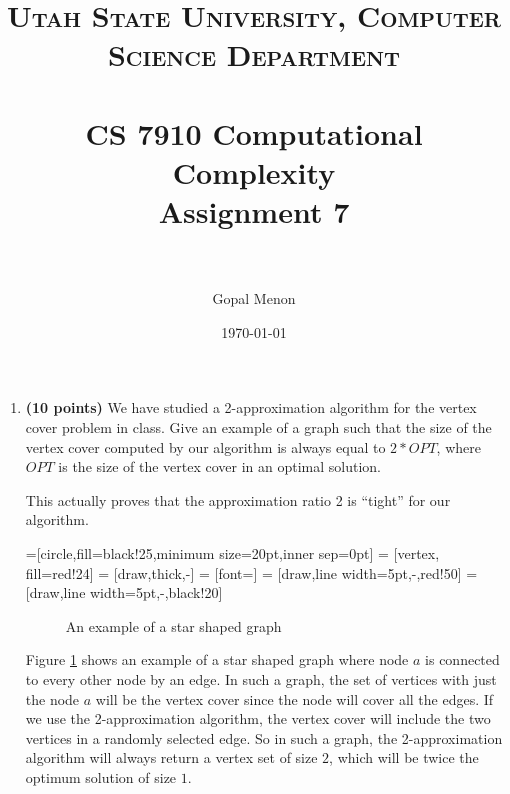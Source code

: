 \documentclass[paper=a4, fontsize=11pt]{scrartcl} %
\title{	
\normalfont \normalsize 
\textsc{Utah State University, Computer Science Department} \\ [25pt] %
\horrule{0.5pt} \\[0.4cm] %
\huge CS 7910 Computational Complexity\\Assignment 7 \\ %
\horrule{2pt} \\[0.5cm] %
}
\author{Gopal Menon} %
\date{\normalsize\today} %
\numberwithin{figure}{section} %
\numberwithin{table}{section} %
\begin{document}
\maketitle %

\begin{enumerate}
\item \textbf{(10 points)} We have studied a 2-approximation algorithm for the vertex cover problem in class. Give an example of a graph such that the size of the vertex cover computed by our algorithm is always equal to $2 * OPT$, where $OPT$ is the size of the vertex cover in an optimal solution.

This actually proves that the approximation ratio 2 is \enquote{tight} for our algorithm.
\begin{comment}

\end{comment}

\begin{frame}

=[circle,fill=black!25,minimum size=20pt,inner sep=0pt]
 = [vertex, fill=red!24]
 = [draw,thick,-]
 = [font=\small]
 = [draw,line width=5pt,-,red!50]
 = [draw,line width=5pt,-,black!20]

\begin{figure}[hb]
\centering
{}
\caption{An example of a star shaped graph}
\label{StarGraph}
\end{figure}


\end{frame}

Figure \ref{StarGraph} shows an example of a star shaped graph where node $a$ is connected to every other node by an edge. In such a graph, the set of vertices with just the node $a$ will be the vertex cover since the node will cover all the edges. If we use the 2-approximation algorithm, the vertex cover will include the two vertices in a randomly selected edge. So in such a graph, the 2-approximation algorithm will always return a vertex set of size $2$, which will be twice the optimum solution of size $1$. 


\end{enumerate}
\end{document}
